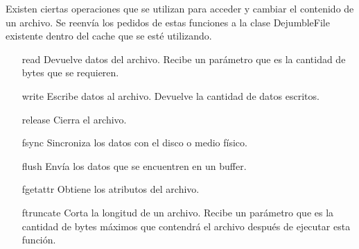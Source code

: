 Existen ciertas operaciones que se utilizan para acceder y cambiar el contenido de un archivo. Se reenvía los pedidos de estas funciones a la clase DejumbleFile existente dentro del cache que se esté utilizando.

\begin{itemize}
\item[read] Devuelve datos del archivo. Recibe un parámetro que es la cantidad de bytes que se requieren.
\item[write] Escribe datos al archivo. Devuelve la cantidad de datos escritos.
\item[release] Cierra el archivo.
\item[fsync] Sincroniza los datos con el disco o medio físico.
\item[flush] Envía los datos que se encuentren en un buffer.
\item[fgetattr] Obtiene los atributos del archivo.
\item[ftruncate] Corta la longitud de un archivo. Recibe un parámetro que es la cantidad de bytes máximos que contendrá el archivo después de ejecutar esta función.
\end{itemize}





